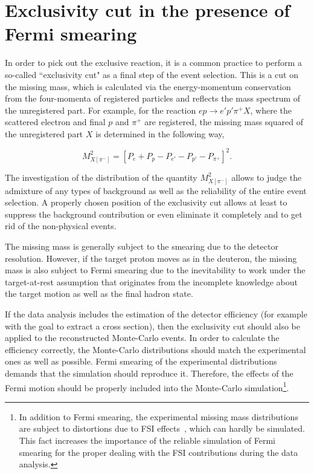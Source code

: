\section{Exclusivity cut in the presence of Fermi smearing}

In order to pick out the exclusive reaction, it is a common practice to perform a so-called ``exclusivity cut" as a final step of the event selection. This is a cut on the missing mass, which is calculated via the energy-momentum conservation from the four-momenta of registered particles and reflects the mass spectrum of the unregistered part. For example, for the reaction $ep\rightarrow e'p'\pi^{+}X$, where the scattered electron and final $p$ and $\pi^{+}$ are registered, the missing mass squared of the unregistered part $X$ is determined in the following way,


 \begin{equation}
 M_{X[\pi^{-}]}^{2}=[P_{e} + P_{p}- P_{e'}- P_{p'}-  P_{\pi^{+}}]^{2}.\label{eq:main_top_mm_nosq}
\end{equation}

The investigation of the distribution of the quantity $M_{X[\pi^{-}]}^{2}$ allows to judge the admixture of any types of background as well as the reliability of the entire event selection. A properly chosen position of the exclusivity cut allows at least to suppress the background contribution or even eliminate it completely and to get rid of the non-physical events.


The missing mass is generally subject to the smearing due to the detector resolution. However, if the target proton moves as in the deuteron, the missing mass is also subject to Fermi smearing due to the inevitability to work under the target-at-rest assumption that originates from the incomplete knowledge about the target motion as well as the final hadron state.

If the data analysis includes the estimation of the detector efficiency (for example with the goal to extract a cross section), then the exclusivity cut should also be applied to the reconstructed Monte-Carlo events. In order to calculate the efficiency correctly, the Monte-Carlo distributions should match the experimental ones as well as possible. Fermi smearing of the experimental distributions demands that the simulation should reproduce it. Therefore, the effects of the Fermi motion should be properly included into the Monte-Carlo simulation\footnote[4]{In addition to Fermi smearing, the experimental missing mass distributions are subject to distortions due to FSI effects~\cite{Skorodumina:2015rea}, which can hardly be simulated. This fact increases the importance of the reliable simulation of Fermi smearing for the proper dealing with the FSI contributions during the data analysis. }. 


